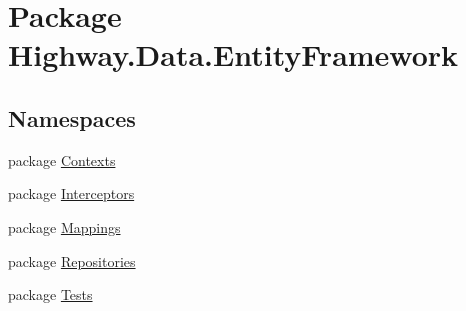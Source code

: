 \hypertarget{namespace_highway_1_1_data_1_1_entity_framework}{\section{Package Highway.\-Data.\-Entity\-Framework}
\label{namespace_highway_1_1_data_1_1_entity_framework}
}
\subsection*{Namespaces}
\begin{DoxyCompactItemize}
\item 
package \hyperlink{namespace_highway_1_1_data_1_1_entity_framework_1_1_contexts}{Contexts}
\item 
package \hyperlink{namespace_highway_1_1_data_1_1_entity_framework_1_1_interceptors}{Interceptors}
\item 
package \hyperlink{namespace_highway_1_1_data_1_1_entity_framework_1_1_mappings}{Mappings}
\item 
package \hyperlink{namespace_highway_1_1_data_1_1_entity_framework_1_1_repositories}{Repositories}
\item 
package \hyperlink{namespace_highway_1_1_data_1_1_entity_framework_1_1_tests}{Tests}
\end{DoxyCompactItemize}
